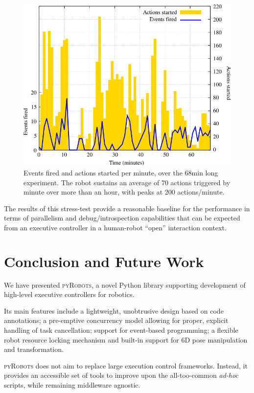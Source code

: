 \documentclass[a4paper, 10pt, conference]{ieeeconf}      %
\newcommand{\pyRobots}{\textsc{pyRobots}}
\begin{document}
\begin{figure}
    \centering
    \includegraphics[width=0.9\columnwidth]{croquignole-expe}
    \caption{Events fired and actions started per minute, over the 68min long
    experiment. The robot sustains an average of 70 actions triggered by minute over
    more than an hour, with peaks at 200 actions/minute.}
    \label{croq_actions}
\end{figure}

The results of this stress-test provide a reasonable baseline for the
performance in terms of parallelism and debug/introspection capabilities that
can be expected from an executive controller in a human-robot ``open''
interaction context.

\section{Conclusion and Future Work}


We have presented \pyRobots{}, a novel Python library supporting
development of high-level executive controllers for robotics.

Its main features include a lightweight, unobtrusive design based on code
annotations; a pre-emptive concurrency model allowing for proper, explicit
handling of task cancellation; support for event-based programming; a flexible
robot resource locking mechanism and built-in support for 6D pose
manipulation and transformation.

\pyRobots{} does not aim to replace large execution control frameworks. Instead,
it provides an accessible set of tools to improve upon the all-too-common
\emph{ad-hoc} scripts, while remaining middleware agnostic.
\end{document}
